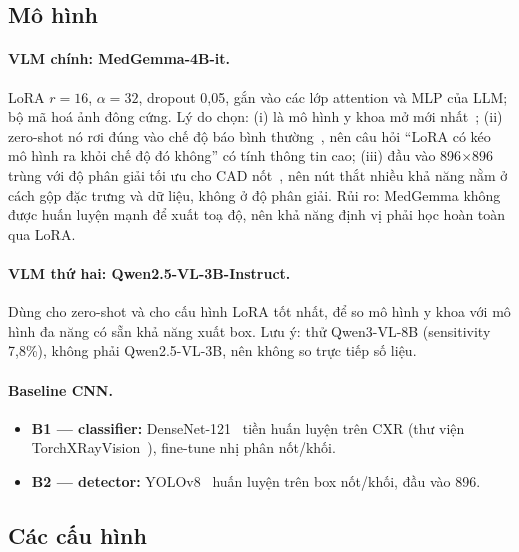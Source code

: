 \subsection{Mô hình}

\paragraph{VLM chính: MedGemma-4B-it.} LoRA $r = 16$, $\alpha = 32$, dropout 0,05, gắn vào các lớp attention
và MLP của LLM; bộ mã hoá ảnh đông cứng. Lý do chọn: (i) là mô hình y khoa mở mới nhất~\cite{sellergren2026medgemma};
(ii) zero-shot nó rơi đúng vào chế độ báo bình thường~\cite{nishio2026zeroshot}, nên câu hỏi ``LoRA có kéo mô
hình ra khỏi chế độ đó không'' có tính thông tin cao; (iii) đầu vào 896$\times$896 trùng với độ phân giải tối ưu
cho CAD nốt~\cite{kim2020matrix}, nên nút thắt nhiều khả năng nằm ở cách gộp đặc trưng và dữ liệu, không ở độ
phân giải. Rủi ro: MedGemma không được huấn luyện mạnh để xuất toạ độ, nên khả năng định vị phải học hoàn toàn
qua LoRA.

\paragraph{VLM thứ hai: Qwen2.5-VL-3B-Instruct.} Dùng cho zero-shot và cho cấu hình LoRA tốt nhất, để so mô
hình y khoa với mô hình đa năng có sẵn khả năng xuất box. Lưu ý: \cite{nishio2026zeroshot} thử Qwen3-VL-8B
(sensitivity 7,8\%), không phải Qwen2.5-VL-3B, nên không so trực tiếp số liệu.

\paragraph{Baseline CNN.}
\begin{itemize}
  \item \textbf{B1 --- classifier:} DenseNet-121~\cite{huang2017densenet} tiền huấn luyện trên CXR
        (thư viện TorchXRayVision~\cite{cohen2022torchxrayvision}), fine-tune nhị phân nốt/khối.
  \item \textbf{B2 --- detector:} YOLOv8~\cite{jocher2023yolov8} huấn luyện trên box nốt/khối, đầu vào 896.
\end{itemize}

\subsection{Các cấu hình}

